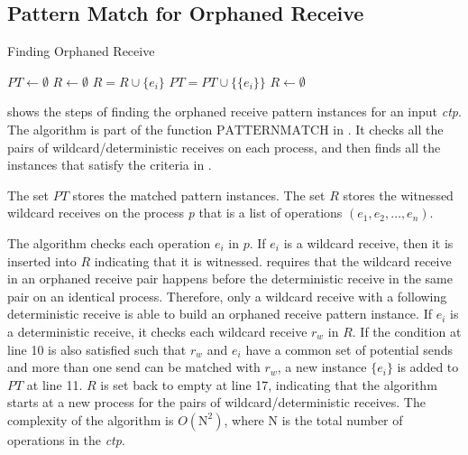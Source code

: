 \subsection{Pattern Match for Orphaned Receive}

\begin{algorithm}
\caption{Finding Orphaned Receive}\label{algo:mismatch}
\begin{algorithmic}[1]
\State $\mathit{PT} \gets \emptyset$
\State $\mathit{R} \gets \emptyset$
\State $\mathit{R} = \mathit{R} \cup \{e_i\}$
\EndIf
{}
\State $\mathit{PT} = \mathit{PT} \cup \{\{e_i\}\}$
\EndIf
\EndFor
\EndIf
\EndFor
\State $\mathit{R} \gets \emptyset$
\EndFor
\end{algorithmic}
\end{algorithm}

 shows the steps of finding the orphaned receive pattern instances for an input \textit{ctp}. The algorithm is part of the function $\mathrm{PATTERNMATCH}$ in .  
It checks all the pairs of wildcard/deterministic receives on each process, and then finds all the instances that satisfy the criteria in . 

The set $\mathit{PT}$ stores the matched pattern instances.
The set $\mathit{R}$ stores the witnessed wildcard receives on the process \textit{p} that is a list of operations $(e_1, e_2, \dots, e_n)$. 

The algorithm checks each operation $e_i$ in $p$. If $e_i$ is a wildcard receive, then it is inserted into $\mathit{R}$ indicating that it is witnessed.  requires that the wildcard receive in an orphaned receive pair happens before the deterministic receive in the same pair on an identical process. Therefore, only a wildcard receive with a following deterministic receive is able to build an orphaned receive pattern instance. If $e_i$ is a deterministic receive, it checks each wildcard receive $r_w$ in $\mathit{R}$. If the condition at line 10 is also satisfied such that $r_w$ and $e_i$ have a common set of potential sends and more than one send can be matched with $r_w$, a new instance $\{e_i\}$ is added to $\mathit{PT}$ at line 11. $R$ is set back to empty at line 17, indicating that the algorithm starts at a new process for the pairs of wildcard/deterministic receives.
The complexity of the algorithm is $O(\mathrm{N}^2)$, where $\mathrm{N}$ is the total number of operations in the \textit{ctp}. 

